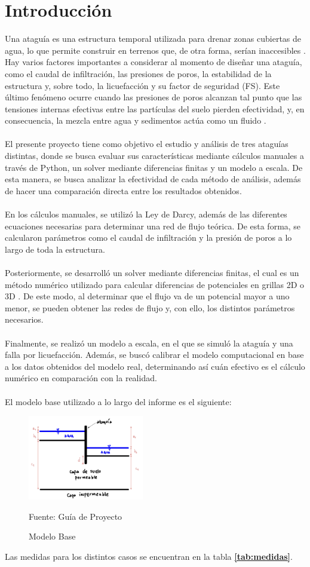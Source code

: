 \part{Introducción}

Una ataguía es una estructura temporal utilizada para drenar zonas cubiertas de agua, lo que permite construir en terrenos que, de otra forma, serían inaccesibles \textbf{\cite{madanayaka2018}}. Hay varios factores importantes a considerar al momento de diseñar una ataguía, como el caudal de infiltración, las presiones de poros, la estabilidad de la estructura y, sobre todo, la licuefacción y su factor de seguridad (FS). Este último fenómeno ocurre cuando las presiones de poros alcanzan tal punto que las tensiones internas efectivas entre las partículas del suelo pierden efectividad, y, en consecuencia, la mezcla entre agua y sedimentos actúa como un fluido \textbf{\cite{sumer2009}}.
\\ \\
El presente proyecto tiene como objetivo el estudio y análisis de tres ataguías distintas, donde se busca evaluar sus características mediante cálculos manuales a través de Python, un solver mediante diferencias finitas y un modelo a escala. De esta manera, se busca analizar la efectividad de cada método de análisis, además de hacer una comparación directa entre los resultados obtenidos.
\\ \\
En los cálculos manuales, se utilizó la Ley de Darcy, además de las diferentes ecuaciones necesarias para determinar una red de flujo teórica. De esta forma, se calcularon parámetros como el caudal de infiltración y la presión de poros a lo largo de toda la estructura.
\\ \\
Posteriormente, se desarrolló un solver mediante diferencias finitas, el cual es un método numérico utilizado para calcular diferencias de potenciales en grillas 2D o 3D \textbf{\cite{zhang2005}}. De este modo, al determinar que el flujo va de un potencial mayor a uno menor, se pueden obtener las redes de flujo y, con ello, los distintos parámetros necesarios.
\\ \\
Finalmente, se realizó un modelo a escala, en el que se simuló la ataguía y una falla por licuefacción. Además, se buscó calibrar el modelo computacional en base a los datos obtenidos del modelo real, determinando así cuán efectivo es el cálculo numérico en comparación con la realidad.
\\ \\
El modelo base utilizado a lo largo del informe es el siguiente:

\begin{figure}[H]
    \centering
    \includegraphics[width=0.45\textwidth]{FOTOS/modelo_base.png}
    \caption{Modelo Base}
    Fuente: Guía de Proyecto
    \label{fig:modelo_base}
\end{figure}

Las medidas para los distintos casos se encuentran en la tabla \textbf{\ref{tab:medidas}}.
